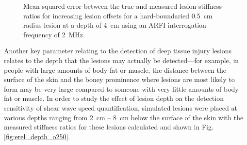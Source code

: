 			\begin{figure}[!htb]
				\centering
				\caption[Shear-wave speed quantified mean squared error related to lesion offset]{Mean squared error between the true and measured lesion stiffness ratios for increasing lesion offsets for a hard-boundaried \SI{0.5}{cm} radius lesion at a depth of \SI{4}{\cm} using an ARFI interrogation frequency of \SI{2}{\MHz}.}
				\label{fig:erel_doff_mse_d4}
			\end{figure}

			Another key parameter relating to the detection of deep tissue injury lesions relates to the depth that the lesions may actually be detected---for example, in people with large amounts of body fat or muscle, the distance between the surface of the skin and the boney prominence where lesions are most likely to form may be very large compared to someone with very little amounts of body fat or muscle. In order to study the effect of lesion depth on the detection sensitivity of shear wave speed quantification, simulated lesions were placed at various depths ranging from \SI{2}{\cm} -- \SI{8}{\cm} below the surface of the skin with the measured stiffness ratios for these lesions calculated and shown in Fig. \ref{fig:erel_depth_o250}.

